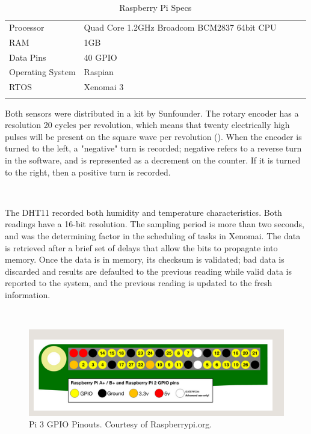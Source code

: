 \documentclass[letterpaper, 12pt]{article}
\begin{document}
\begin{table}[hbt]
	\centering
	\caption{Raspberry Pi Specs}
	\label{my-label}
	\begin{tabular}{lllll}
		\cline{1-2}
		\multicolumn{1}{|l|}{Processor} & \multicolumn{1}{l|}{Quad Core 1.2GHz Broadcom BCM2837 64bit CPU} &  &  &  \\ \cline{1-2}
		\multicolumn{1}{|l|}{RAM} & \multicolumn{1}{l|}{1GB} &  &  &  \\ \cline{1-2}
		\multicolumn{1}{|l|}{Data Pins} & \multicolumn{1}{l|}{40 GPIO} &  &  &  \\ \cline{1-2}
		\multicolumn{1}{|l|}{Operating System} & \multicolumn{1}{l|}{Raspian} &  &  &  \\ \cline{1-2}
		\multicolumn{1}{|l|}{RTOS} & \multicolumn{1}{l|}{Xenomai 3} &  &  &  \\ \cline{1-2}
		&                       &  &  & 
	\end{tabular}
\end{table}

\indent Both sensors were distributed in a kit by Sunfounder.  The rotary encoder has a resolution 20 cycles per revolution, which means that twenty electrically high pulses will be present on the square wave per revolution (\cite{artofcircuits2018}).  When the encoder is turned to the left, a "negative" turn is recorded; negative refers to a reverse turn in the software, and is represented as a decrement on the counter.  If it is turned to the right, then a positive turn is recorded.  

~\newpage

\indent The DHT11 recorded both humidity and temperature characteristics.  Both readings have a 16-bit resolution.  The sampling period is more than two seconds, and was the determining factor in the scheduling of tasks in Xenomai. The data is retrieved after a brief set of delays that allow the bits to propagate into memory.  Once the data is in memory, its checksum is validated; bad data is discarded and results are defaulted to the previous reading while valid data is reported to the system, and the previous reading is updated to the fresh information.

~\newline
\begin{figure}[H]
	\centering
	\includegraphics[width=15cm,keepaspectratio]{pi_GPIO.png}
	\caption[GPIO]{Pi 3 GPIO Pinouts. Courtesy of Raspberrypi.org.}
	\label{fig:GPIO}
\end{figure}
\end{document}

